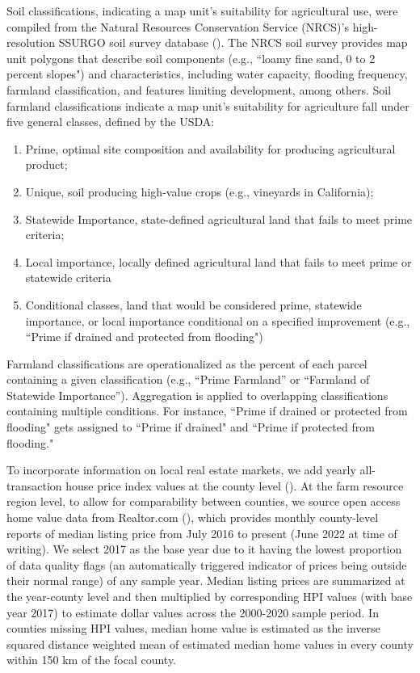 \documentclass[12pt]{article}
\begin{document}
Soil classifications, indicating a map unit's suitability for agricultural use, were compiled from the Natural Resources Conservation Service (NRCS)’s high-resolution SSURGO soil survey database (\cite{SoilSurveyStaffSoilStates}). The NRCS soil survey provides map unit polygons that describe soil components (e.g., ``loamy fine sand, 0 to 2 percent slopes") and characteristics, including water capacity, flooding frequency, farmland classification, and features limiting development, among others. Soil farmland classifications indicate a map unit's suitability for agriculture fall under five general classes, defined by the USDA:
\begin{enumerate}
    \item Prime, optimal site composition and availability for producing agricultural product;  
    \item Unique, soil producing high-value crops (e.g., vineyards in California); 
    \item Statewide Importance, state-defined agricultural land that fails to meet prime criteria;
    \item Local importance, locally defined agricultural land that fails to meet prime or statewide criteria
    \item Conditional classes, land that would be considered prime, statewide importance, or local importance conditional on a specified improvement (e.g., ``Prime if drained and protected from flooding")
\end{enumerate}

Farmland classifications are operationalized as the percent of each parcel containing a given classification (e.g., ``Prime Farmland” or ``Farmland of Statewide Importance”). Aggregation is applied to overlapping classifications containing multiple conditions. For instance, ``Prime if drained or protected from flooding" gets assigned to ``Prime if drained" and ``Prime if protected from flooding." 

To incorporate information on local real estate markets, we add yearly all-transaction house price index values at the county level (\cite{FederalHousing2022}). At the farm resource region level, to allow for comparability between counties, we source open access home value data from Realtor.com (\cite{RealtorData}), which provides monthly county-level reports of median listing price from July 2016 to present (June 2022 at time of writing). We select 2017 as the base year due to it having the lowest proportion of data quality flags (an automatically triggered indicator of prices being outside their normal range) of any sample year. Median listing prices are summarized at the year-county level and then multiplied by corresponding HPI values (with base year 2017) to estimate dollar values across the 2000-2020 sample period. In counties missing HPI values, median home value is estimated as the inverse squared distance weighted mean of estimated median home values in every county within 150 km of the focal county. 
\end{document}
